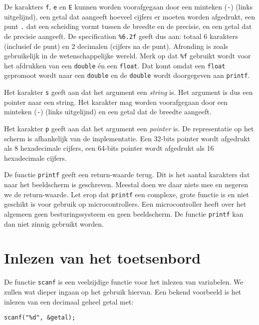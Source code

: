 De karakters \texttt{f}, \texttt{e} en \texttt{E} kunnen worden voorafgegaan door een minteken (\texttt{-}) (links uitgelijnd), een getal dat aangeeft hoeveel cijfers er moeten worden afgedrukt, een punt \texttt{\texttt{.}} dat een scheiding vormt tussen de breedte en de precisie, en een getal dat de precisie aangeeft. De specification \texttt{\%6.2f} geeft dus aan: totaal 6 karakters (inclusief de punt) en 2 decimalen (cijfers na de punt). Afronding is zoals gebruikelijk in de wetenschappelijke wereld. Merk op dat \texttt{\%f} gebruikt wordt voor het afdrukken van een \texttt{double} én een \texttt{float}. Dat komt omdat een \texttt{float} gepromoot wordt naar een \texttt{double} en de \texttt{double} wordt doorgegeven aan \texttt{printf}.

Het karakter \texttt{s} geeft aan dat het argument een \textsl{string} is. Het argument is dus een pointer naar een string. Het karakter mag worden voorafgegaan door een minteken (\texttt{-}) (links uitgelijnd) en een getal dat de breedte aangeeft.

Het karakter \texttt{p} geeft aan dat het argument een \textsl{pointer} is. De representatie op het scherm is afhankelijk van de implementatie. Een 32-bits pointer wordt afgedrukt als 8 hexadecimale cijfers, een 64-bits pointer wordt afgedrukt als 16 hexadecimale cijfers.

De functie \texttt{printf} geeft een return-waarde terug. Dit is het aantal karakters dat naar het beeldscherm is geschreven. Meestal doen we daar niets mee en negeren we de return-waarde.
Let erop dat \texttt{printf} een complexe, grote functie is en niet geschikt is voor gebruik op microcontrollers. Een microcontroller heeft over het algemeen geen besturingssysteem en geen beeldscherm. De functie \texttt{printf} kan dan niet zinnig gebruikt worden.


\section{Inlezen van het toetsenbord}
\label{sec:scanf}
De functie \texttt{scanf} is een veelzijdige functie voor het inlezen van variabelen. We zullen wat dieper ingaan op het gebruik hiervan. Een bekend voorbeeld is het inlezen van een decimaal geheel getal met:

\begin{lstlisting}[style=lstoneline]
scanf("%d", &getal);
\end{lstlisting}

